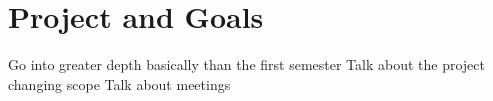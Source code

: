 \section{Project and Goals}\label{projectandgoals}

Go into greater depth basically than the first semester
Talk about the project changing scope
Talk about meetings
